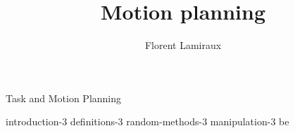 \documentclass[xcolor = {svgnames,x11names}]{beamer}
\title {Motion planning}
\subtitle{}
\author[]
{Florent Lamiraux}
\institute[CNRS-LAAS] %
{
  CNRS-LAAS, Toulouse, France
}
\date[] %
{}
\begin{document}
\lstset{
breakatwhitespace=true,
breaklines=true
tabsize=3,
}

\begin{frame}
  \titlepage
\end{frame}

%
\begin{frame}{Task and Motion Planning}
\end{frame}

 {introduction-3}
 {definitions-3}
 {random-methods-3}
 {manipulation-3}
 {be}
\end{document}
